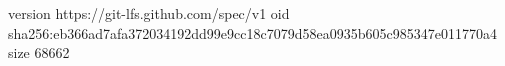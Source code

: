 version https://git-lfs.github.com/spec/v1
oid sha256:eb366ad7afa372034192dd99e9cc18c7079d58ea0935b605c985347e011770a4
size 68662
